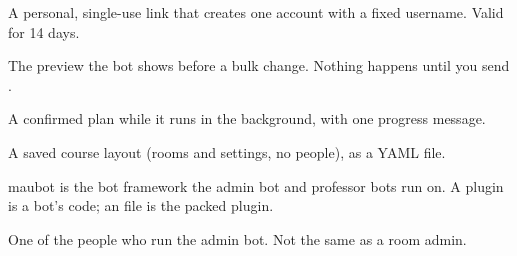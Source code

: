 \begin{description}[style=nextline,leftmargin=1.5em,font=\normalfont\bfseries]
  \item[Signup link] A personal, single-use link that creates one account with a fixed
    username. Valid for 14 days.
  \item[Plan] The preview the bot shows before a bulk change. Nothing happens until you send
    .
  \item[Job] A confirmed plan while it runs in the background, with one progress message.
  \item[Template] A saved course layout (rooms and settings, no people), as a YAML file.
  \item[maubot, plugin, .mbp] maubot is the bot framework the admin bot and professor bots
    run on. A plugin is a bot's code; an  file is the packed plugin.
  \item[Bot admin] One of the people who run the admin bot. Not the same as a room admin.
\end{description}
